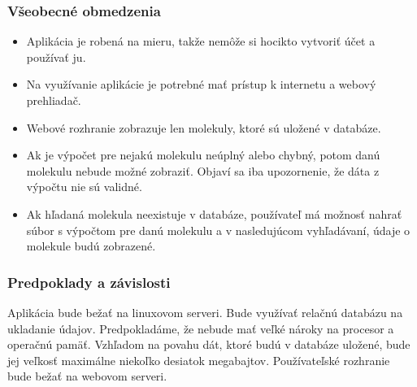 \documentclass[12pt,a4paper]{article}
\begin{document}
\subsubsection{Všeobecné obmedzenia}
\begin{itemize}
	\item Aplikácia je robená na mieru, takže nemôže si hocikto vytvoriť účet a používať ju.
	\item Na využívanie aplikácie je potrebné mať prístup k internetu a webový prehliadač.
	\item Webové rozhranie zobrazuje len molekuly, ktoré sú uložené v databáze.
	\item Ak je výpočet pre nejakú molekulu neúplný alebo chybný, potom danú molekulu nebude možné zobraziť. Objaví sa iba upozornenie, že dáta z výpočtu nie sú validné.
	\item Ak hľadaná molekula neexistuje v databáze, používateľ má možnosť nahrať súbor s výpočtom pre danú molekulu a v nasledujúcom vyhľadávaní, údaje o molekule budú zobrazené.
\end{itemize}

\subsubsection{Predpoklady a závislosti}
Aplikácia bude bežať na linuxovom serveri. Bude využívať relačnú databázu na ukladanie údajov. Predpokladáme, že nebude mať veľké nároky na procesor a operačnú pamäť. Vzhľadom na povahu dát, ktoré budú v databáze uložené, bude jej veľkosť maximálne niekoľko desiatok megabajtov. Používateľské rozhranie bude bežať na webovom serveri.

\pagebreak
\end{document}
